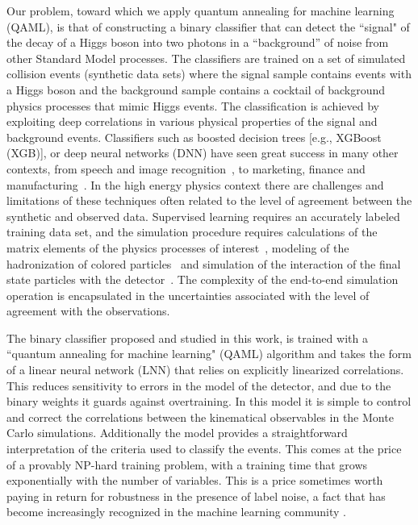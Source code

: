 Our problem, toward which we apply quantum annealing for machine learning (QAML), is that of constructing a binary classifier that can detect the ``signal" of the decay of a Higgs boson into two photons in a ``background'' of noise from other Standard Model processes. The classifiers are trained on a set of simulated collision events 
 (synthetic data sets) where the signal sample contains events with a Higgs boson and the background sample 
 contains a cocktail of background physics processes that mimic Higgs events. The classification is  achieved 
 by exploiting deep correlations in various physical properties of the signal and background events.   
 Classifiers such as boosted decision trees [e.g.,  XGBoost (XGB)], or deep neural networks (DNN) have seen great 
 success in many other contexts, from speech and image recognition~\cite{Le:2013}, to marketing, finance and 
 manufacturing~\cite{BigDataMarketing:2015}. In the high energy physics context there are challenges and limitations 
 of these  techniques often related to the level of agreement between the synthetic and observed data. Supervised 
 learning requires an accurately labeled training data set, and the simulation procedure requires calculations of the 
 matrix elements of the physics processes of interest~\cite{Alwall:2014hca}, modeling of the hadronization of colored 
 particles~\cite{Sjostrand:2006za} and simulation of the interaction of the final state particles with the detector~\cite{Agostinelli:2002hh}.  
The complexity of the end-to-end simulation operation is encapsulated in the uncertainties associated with the level of agreement with the observations.

The binary classifier proposed and studied in this work, is trained with a ``quantum annealing for machine learning" (QAML) algorithm \cite{Neven1,Pudenz:2013kx}   and takes  the form of a  linear neural network (LNN) that relies on explicitly linearized  correlations. This  reduces sensitivity to errors in the model of  the detector, and due to the binary weights  it guards against overtraining.  In this model it is simple to control and correct the correlations  between the kinematical observables in the Monte Carlo simulations. Additionally the model provides a straightforward interpretation  of the criteria used to classify the events. This comes at the price of a provably NP-hard training problem, with a training time  that grows exponentially with the number of variables.  This is a price sometimes worth paying in return for robustness in the presence of label noise, a fact that has become increasingly recognized in the machine learning community \cite{Long:2010fj,Manwani:2013qv,ICML2012Denchev_461}. 

